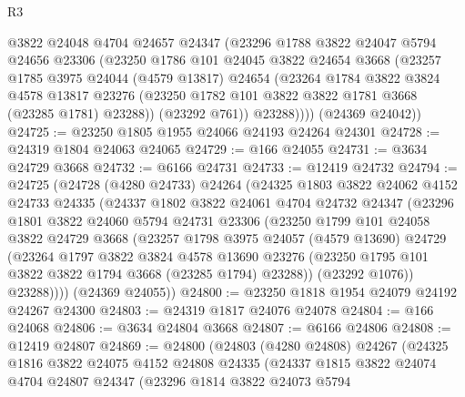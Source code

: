 \begin{lexlean}{R3}
\begin{coremodule}
          @3822
          @24048
          @4704
          @24657
          @24347
          (@23296
            @1788
            @3822
            @24047
            @5794
            @24656
            @23306
            (@23250
              @1786
              @101
              @24045
              @3822
              @24654
              @3668
              (@23257
                @1785
                @3975
                @24044
                (@4579 @13817)
                @24654
                (@23264
                  @1784
                  @3822
                  @3824
                  @4578
                  @13817
                  @23276
                  (@23250 @1782 @101 @3822 @3822 @1781 @3668 (@23285 @1781) @23288))
                (@23292 @761))
              @23288))))
      (@24369 @24042))
@24725 := @23250 @1805 @1955 @24066 @24193 @24264 @24301
@24728 := @24319 @1804 @24063 @24065
@24729 := @166 @24055
@24731 := @3634 @24729 @3668
@24732 := @6166 @24731
@24733 := @12419 @24732
@24794 := @24725
    (@24728
      (@4280 @24733)
      @24264
      (@24325
        @1803
        @3822
        @24062
        @4152
        @24733
        @24335
        (@24337
          @1802
          @3822
          @24061
          @4704
          @24732
          @24347
          (@23296
            @1801
            @3822
            @24060
            @5794
            @24731
            @23306
            (@23250
              @1799
              @101
              @24058
              @3822
              @24729
              @3668
              (@23257
                @1798
                @3975
                @24057
                (@4579 @13690)
                @24729
                (@23264
                  @1797
                  @3822
                  @3824
                  @4578
                  @13690
                  @23276
                  (@23250 @1795 @101 @3822 @3822 @1794 @3668 (@23285 @1794) @23288))
                (@23292 @1076))
              @23288))))
      (@24369 @24055))
@24800 := @23250 @1818 @1954 @24079 @24192 @24267 @24300
@24803 := @24319 @1817 @24076 @24078
@24804 := @166 @24068
@24806 := @3634 @24804 @3668
@24807 := @6166 @24806
@24808 := @12419 @24807
@24869 := @24800
    (@24803
      (@4280 @24808)
      @24267
      (@24325
        @1816
        @3822
        @24075
        @4152
        @24808
        @24335
        (@24337
          @1815
          @3822
          @24074
          @4704
          @24807
          @24347
          (@23296
            @1814
            @3822
            @24073
            @5794

\end{coremodule}
\end{lexlean}
